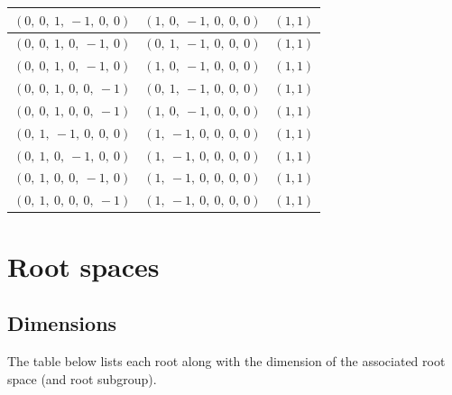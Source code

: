 \documentclass[11pt]{article}
\theoremstyle{definition}
\begin{document}
\begin{longtable}{|l|l|c|}
    \hline
    $\left( 0, \  0, \  1, \  -1, \  0, \  0\right)$ & $\left( 1, \  0, \  -1, \  0, \  0, \  0\right)$ & $(1,1)$ \\
    \hline
    $\left( 0, \  0, \  1, \  0, \  -1, \  0\right)$ & $\left( 0, \  1, \  -1, \  0, \  0, \  0\right)$ & $(1,1)$ \\
    \hline
    $\left( 0, \  0, \  1, \  0, \  -1, \  0\right)$ & $\left( 1, \  0, \  -1, \  0, \  0, \  0\right)$ & $(1,1)$ \\
    \hline
    $\left( 0, \  0, \  1, \  0, \  0, \  -1\right)$ & $\left( 0, \  1, \  -1, \  0, \  0, \  0\right)$ & $(1,1)$ \\
    \hline
    $\left( 0, \  0, \  1, \  0, \  0, \  -1\right)$ & $\left( 1, \  0, \  -1, \  0, \  0, \  0\right)$ & $(1,1)$ \\
    \hline
    $\left( 0, \  1, \  -1, \  0, \  0, \  0\right)$ & $\left( 1, \  -1, \  0, \  0, \  0, \  0\right)$ & $(1,1)$ \\
    \hline
    $\left( 0, \  1, \  0, \  -1, \  0, \  0\right)$ & $\left( 1, \  -1, \  0, \  0, \  0, \  0\right)$ & $(1,1)$ \\
    \hline
    $\left( 0, \  1, \  0, \  0, \  -1, \  0\right)$ & $\left( 1, \  -1, \  0, \  0, \  0, \  0\right)$ & $(1,1)$ \\
    \hline
    $\left( 0, \  1, \  0, \  0, \  0, \  -1\right)$ & $\left( 1, \  -1, \  0, \  0, \  0, \  0\right)$ & $(1,1)$ \\
    \hline
\end{longtable}

\fi

\newpage
\section{Root spaces}

\subsection{Dimensions}

The table below lists each root along with the dimension of the associated root space (and root subgroup).

\bigskip
\end{document}
